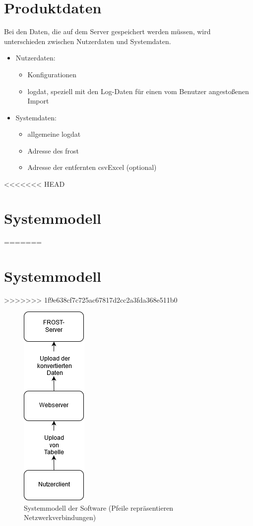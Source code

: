 \documentclass[a4paper, 12 pt]{article}
\begin{document}
	\pagebreak
	\section{Produktdaten}
	
	Bei den Daten, die auf dem Server gespeichert werden müssen, wird unterschieden zwischen Nutzerdaten und Systemdaten.
	
\begin{itemize}
	\item Nutzerdaten:
	\begin{itemize}
		\item Konfigurationen
		\item \gls{logdat}, speziell mit den Log-Daten für einen vom Benutzer angestoßenen Import
	\end{itemize}
	\item Systemdaten:
	\begin{itemize}
		\item allgemeine \gls{logdat}
		\item Adresse des \gls{frost}
		\item Adresse der entfernten \gls{csvExcel} (optional) 
	\end{itemize}
\end{itemize}

<<<<<<< HEAD
\newpage
\section{Systemmodell}
=======
\pagebreak
	\section{Systemmodell}
>>>>>>> 1f9e638cf7c725ac67817d2cc2a3fda368e511b0
	\begin{figure}[htbp]
	\centering
	\includegraphics[scale=1]{images/sysmodel}
	\caption{\label{fig:system}Systemmodell der Software (Pfeile repräsentieren Netzwerkverbindungen)}
	\end{figure}	
	\pagebreak
\end{document}
